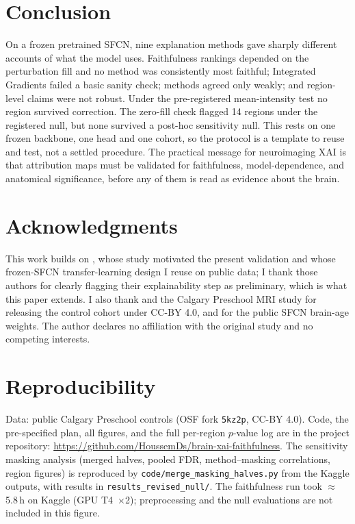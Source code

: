 \documentclass[11pt]{article}
\begin{document}
\section{Conclusion}
On a frozen pretrained SFCN, nine explanation methods gave sharply different accounts of what
the model uses. Faithfulness rankings depended on the perturbation fill and no method was consistently most faithful; Integrated Gradients failed a basic
sanity check; methods agreed only weakly; and region-level claims were not robust. Under the pre-registered mean-intensity test no region survived correction. The zero-fill check flagged 14 regions under the registered null, but none survived a post-hoc sensitivity null. This rests on one frozen backbone, one head and one cohort, so the protocol is a template to reuse and test, not a settled procedure. The practical message for
neuroimaging XAI is that attribution maps must be validated
for faithfulness, model-dependence, and anatomical significance, before any of them is
read as evidence about the brain.

\section*{Acknowledgments}
This work builds on \citet{das2024}, whose study motivated the present validation and whose
frozen-SFCN transfer-learning design I reuse on public data; I thank those authors for
clearly flagging their explainability step as preliminary, which is what this paper extends.
I also thank \citet{reynolds2020} and the Calgary Preschool MRI study for releasing the
control cohort under CC-BY 4.0, and \citet{peng2021} for the public SFCN brain-age weights.
The author declares no affiliation with the original study and no competing interests.

\section*{Reproducibility}
\sloppy
Data: public Calgary Preschool controls (OSF fork \texttt{5kz2p}, CC-BY 4.0). Code, the
pre-specified plan, all figures, and the full per-region $p$-value log are in the project
repository: \url{https://github.com/HoussemDs/brain-xai-faithfulness}. The sensitivity masking
analysis (merged halves, pooled FDR, method--masking correlations, region figures) is reproduced by
\texttt{code/}\allowbreak\texttt{merge\_masking\_halves.py} from the Kaggle outputs, with results in
\texttt{results\_}\allowbreak\texttt{revised\_null/}. The faithfulness run took $\approx$5.8\,h on Kaggle (GPU T4~$\times$2); preprocessing and the null evaluations are not included in this figure.
\end{document}
